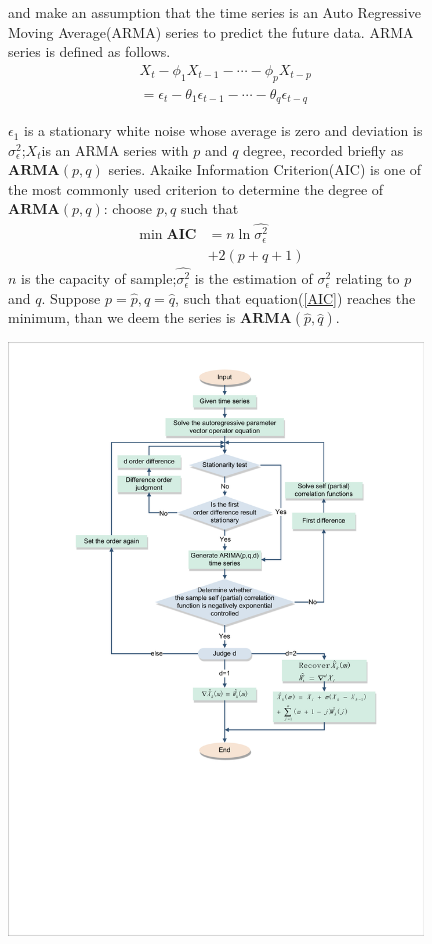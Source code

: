 \documentclass{mcmthesis}
\numberwithin{figure}{section}
\numberwithin{table}{section}
\numberwithin{equation}{section}
\begin{document}
\begin{figure}[ht]
\begin{minipage}[htbp]{0.37\linewidth}
  and make an assumption that the time series is an Auto 
  Regressive Moving Average(ARMA) series to predict the 
  future data. ARMA series is defined as follows.
  \begin{align*}
    &X_t-\phi_1X_{t-1}-\cdots -\phi_pX_{t-p} \\
    &= \epsilon_t - \theta_1\epsilon_{t-1}-\cdots-\theta_q\epsilon_{t-q}
  \end{align*}
 
$ \epsilon_1 $ is a stationary white noise whose average is zero and
deviation is $ \sigma_\epsilon^2 $;$ X_t $is an ARMA series with $ p $ and $ q $
degree, recorded briefly as $ \mathbf{ARMA}(p,q) $ series.
Akaike Information Criterion(AIC) is one of the most commonly used
criterion to determine the degree of $ \mathbf{ARMA}(p,q) $: choose 
$ p,q $ such that 
\begin{equation}\label{AIC}
  \begin{aligned}
    \min \mathbf{AIC} &= n\ln \hat{\sigma_\epsilon^2} \\
    &+ 2(p+q+1)
  \end{aligned}
\end{equation}
$ n $ is the capacity of sample;$ \hat{\sigma_\epsilon^2} $ is the
estimation of $ \sigma_\epsilon^2 $ relating to $ p $ and $ q $.
Suppose $ p = \hat{p}, q = \hat{q} $, such that equation(\ref{AIC}) reaches the minimum,
than we deem the series is $ \mathbf{ARMA}(\hat{p},\hat{q}) $. 
\end{minipage}
\hfill
\begin{minipage}[htbp]{0.6\linewidth}
  \begin{flushleft}
    \includegraphics[width =11cm]{code&pic/ARIMA_裁剪页面.pdf}

\end{flushleft}
\end{minipage}
\end{figure}
\end{document}
